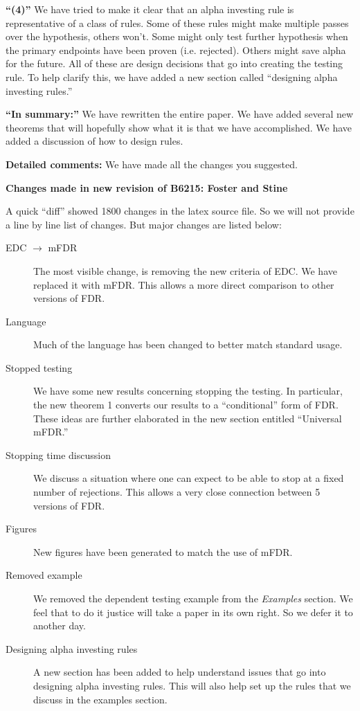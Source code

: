 \documentclass[12pt]{letter}
\begin{document}
{\bf ``(4)''} We have tried to make it clear that an alpha investing
rule is representative of a class of rules.  Some of these rules might make
multiple passes over the hypothesis, others won't.  Some might only
test further hypothesis when the primary endpoints have been proven
(i.e. rejected).  Others might save alpha for the future.  All of
these are design decisions that go into creating the testing rule.  To
help clarify this, we have added a new section called ``designing
alpha investing rules.''

{\bf ``In summary:''} We have rewritten the entire paper.  We have
added several new theorems that will hopefully show what it is that we
have accomplished.  We have added a discussion of how to design rules.

{\bf Detailed comments:} We have made all the changes you suggested.

\newpage
{\bf Changes made in new revision of B6215: Foster and Stine}

A quick ``diff'' showed 1800 changes in the latex source file.  So we
 will not provide a line by line list of changes.  But  major
 changes are listed below:

\begin{description}
\item[EDC $\to$ mFDR] The most visible change, is removing the new
criteria of EDC.  We have replaced it with mFDR.  This allows a more
direct comparison to other versions of FDR.
\item[Language] Much of the language has been changed to better match
standard usage.
\item[Stopped testing] We have some new results concerning stopping
the testing.  In particular, the new theorem 1 converts our results to
a ``conditional'' form of FDR.  These ideas are further elaborated in
the new section entitled ``Universal mFDR.''
\item[Stopping time discussion] We discuss a situation where one can
expect to be able to stop at a fixed number of rejections.  This
allows a very close connection between 5 versions of FDR.
\item[Figures] New figures have been generated to match the use of mFDR.
\item[Removed example] We removed the dependent testing example from
the {\em Examples} section.  We feel that to do it justice will take
a paper in its own right.  So we defer it to another day.
\item[Designing alpha investing rules] A new section has been added to
help understand issues that go into designing alpha investing rules.
This will also help set up the rules that we discuss in the examples
section. 
\end{description}
\end{document}
